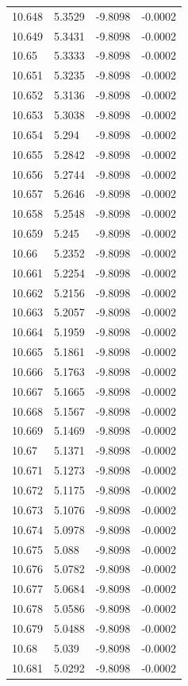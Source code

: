 \begin{tabular}{llll}
10.648 & 5.3529 & -9.8098 & -0.0002 \\
10.649 & 5.3431 & -9.8098 & -0.0002 \\
10.65 & 5.3333 & -9.8098 & -0.0002 \\
10.651 & 5.3235 & -9.8098 & -0.0002 \\
10.652 & 5.3136 & -9.8098 & -0.0002 \\
10.653 & 5.3038 & -9.8098 & -0.0002 \\
10.654 & 5.294 & -9.8098 & -0.0002 \\
10.655 & 5.2842 & -9.8098 & -0.0002 \\
10.656 & 5.2744 & -9.8098 & -0.0002 \\
10.657 & 5.2646 & -9.8098 & -0.0002 \\
10.658 & 5.2548 & -9.8098 & -0.0002 \\
10.659 & 5.245 & -9.8098 & -0.0002 \\
10.66 & 5.2352 & -9.8098 & -0.0002 \\
10.661 & 5.2254 & -9.8098 & -0.0002 \\
10.662 & 5.2156 & -9.8098 & -0.0002 \\
10.663 & 5.2057 & -9.8098 & -0.0002 \\
10.664 & 5.1959 & -9.8098 & -0.0002 \\
10.665 & 5.1861 & -9.8098 & -0.0002 \\
10.666 & 5.1763 & -9.8098 & -0.0002 \\
10.667 & 5.1665 & -9.8098 & -0.0002 \\
10.668 & 5.1567 & -9.8098 & -0.0002 \\
10.669 & 5.1469 & -9.8098 & -0.0002 \\
10.67 & 5.1371 & -9.8098 & -0.0002 \\
10.671 & 5.1273 & -9.8098 & -0.0002 \\
10.672 & 5.1175 & -9.8098 & -0.0002 \\
10.673 & 5.1076 & -9.8098 & -0.0002 \\
10.674 & 5.0978 & -9.8098 & -0.0002 \\
10.675 & 5.088 & -9.8098 & -0.0002 \\
10.676 & 5.0782 & -9.8098 & -0.0002 \\
10.677 & 5.0684 & -9.8098 & -0.0002 \\
10.678 & 5.0586 & -9.8098 & -0.0002 \\
10.679 & 5.0488 & -9.8098 & -0.0002 \\
10.68 & 5.039 & -9.8098 & -0.0002 \\
10.681 & 5.0292 & -9.8098 & -0.0002 \\

\end{tabular}
